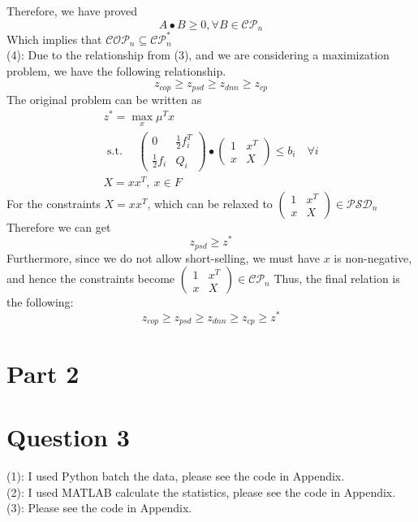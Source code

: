 \documentclass[11pt,a4paper]{article}
\begin{document}
Therefore, we have proved $$A \bullet B\geq 0, \forall B\in \mathcal{C P}_{n} $$ Which implies that $\mathcal{C O P}_{n} \subseteq \mathcal{C} \mathcal{P}_{n}^{*}$\\
(4): Due to the relationship from (3), and we are considering a maximization problem, we have the following relationship. 
$$z_{cop}\geq z_{psd} \geq z_{dnn} \geq z_{cp}$$
The original problem can be written as 
$$
\begin{array}{c}
z^{*}=\max_{x}\mu^{T}x \\
\text { s.t. }
\quad\left(\begin{array}{cc}
0 & \frac{1}{2} f_{i}^{T} \\
\frac{1}{2} f_{i} & Q_{i}
\end{array}\right) \bullet\left(\begin{array}{cc}
1 & x^{T} \\
x & X
\end{array}\right) \leq b_{i} \quad \forall i \\
X=x x^{T}, \ x\in F
\end{array}
$$
For the constraints $X=x x^{T}$, which can be relaxed to $
\left(\begin{array}{cc}
1 & x^{T} \\
x & X
\end{array}\right) \in \mathcal{P} \mathcal{S} \mathcal{D}_{n}
$
Therefore we can get $$z_{psd}\geq z^{*}$$
Furthermore, since we do not allow short-selling, we must have $x$ is non-negative, and hence the constraints become $
\left(\begin{array}{cc}
1 & x^{T} \\
x & X
\end{array}\right) \in \mathcal{C} \mathcal{P}_{n}
$
Thus, the final relation is the following: 
$$z_{cop}\geq z_{psd} \geq z_{dnn} \geq z_{cp}\geq z^{*}$$
\section*{Part 2}
\section*{Question 3}
(1): I used Python batch the data, please see the code in Appendix.\\
(2): I used MATLAB calculate the statistics, please see the code in Appendix.\\
(3): Please see the code in Appendix.
\end{document}
